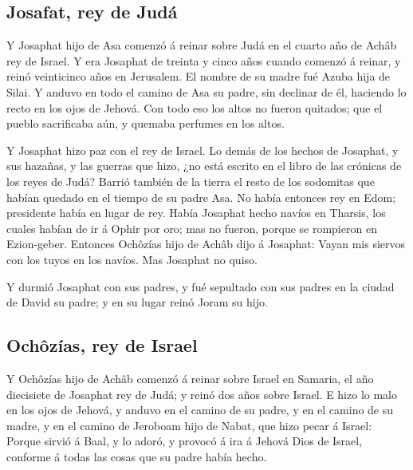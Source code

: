 \hypertarget{josafat-rey-de-juduxe1}{%
\subsection{Josafat, rey de Judá}\label{josafat-rey-de-juduxe1}}

 Y Josaphat hijo de Asa comenzó á reinar sobre Judá en el
cuarto año de Achâb rey de Israel.  Y era Josaphat de
treinta y cinco años cuando comenzó á reinar, y reinó veinticinco años
en Jerusalem. El nombre de su madre fué Azuba hija de Silai.
 Y anduvo en todo el camino de Asa su padre, sin declinar
de él, haciendo lo recto en los ojos de Jehová.  Con todo
eso los altos no fueron quitados; que el pueblo sacrificaba aún, y
quemaba perfumes en los altos.

 Y Josaphat hizo paz con el rey de Israel.  Lo
demás de los hechos de Josaphat, y sus hazañas, y las guerras que hizo,
¿no está escrito en el libro de las crónicas de los reyes de Judá?
 Barrió también de la tierra el resto de los sodomitas que
habían quedado en el tiempo de su padre Asa.  No había
entonces rey en Edom; presidente había en lugar de rey. 
Había Josaphat hecho navíos en Tharsis, los cuales habían de ir á Ophir
por oro; mas no fueron, porque se rompieron en Ezion-geber.
 Entonces Ochôzías hijo de Achâb dijo á Josaphat: Vayan mis
siervos con los tuyos en los navíos. Mas Josaphat no quiso.

 Y durmió Josaphat con sus padres, y fué sepultado con sus
padres en la ciudad de David su padre; y en su lugar reinó Joram su
hijo.

\hypertarget{ochuxf4zuxedas-rey-de-israel}{%
\subsection{Ochôzías, rey de
Israel}\label{ochuxf4zuxedas-rey-de-israel}}

 Y Ochôzías hijo de Achâb comenzó á reinar sobre Israel en
Samaria, el año diecisiete de Josaphat rey de Judá; y reinó dos años
sobre Israel.  E hizo lo malo en los ojos de Jehová, y
anduvo en el camino de su padre, y en el camino de su madre, y en el
camino de Jeroboam hijo de Nabat, que hizo pecar á Israel: Porque sirvió
á Baal, y lo adoró, y provocó á ira á Jehová Dios de Israel, conforme á
todas las cosas que su padre había hecho.
